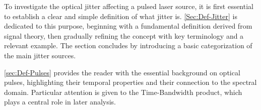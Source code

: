 To investigate the optical jitter affecting a pulsed laser source, it is first essential to establish a clear and simple definition of what jitter is.  
\autoref{Sec:Def-Jitter} is dedicated to this purpose, beginning with a fundamental definition derived from signal theory, then gradually refining the concept with key terminology and a relevant example. The section concludes by introducing a basic categorization of the main jitter sources.

\autoref{sec:Def-Pulses} provides the reader with the essential background on optical pulses, highlighting their temporal properties and their connection to the spectral domain. Particular attention is given to the Time-Bandwidth product, which plays a central role in later analysis.

